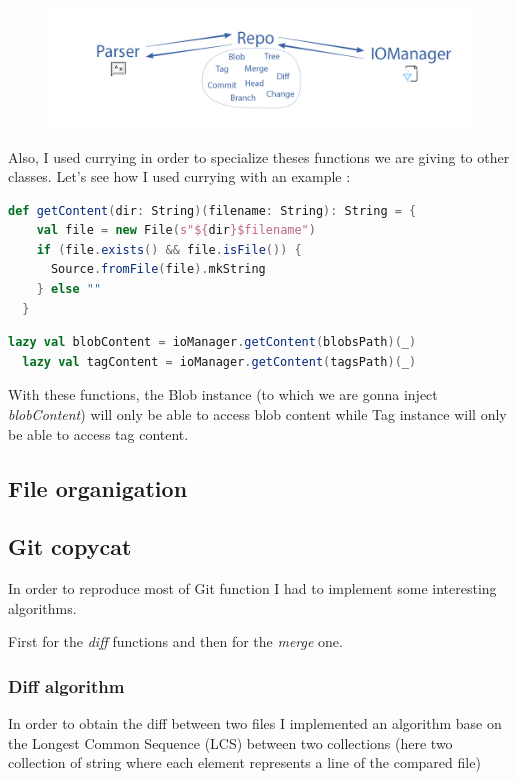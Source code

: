 \documentclass[11pt]{article}
\begin{document}
\begin{figure}[h!]
  \centering
  \includegraphics[width=\linewidth]{img/flowDetailled.png}
\end{figure}

Also, I used currying in order to specialize theses functions we are giving to other classes. Let's see how I used currying with an example :

\begin{lstlisting}[language=scala, caption=Function in IOManager]
  def getContent(dir: String)(filename: String): String = {
    val file = new File(s"${dir}$filename")
    if (file.exists() && file.isFile()) {
      Source.fromFile(file).mkString
    } else ""
  }
\end{lstlisting}

\begin{lstlisting}[language=scala, caption=Functions to be injected]
  lazy val blobContent = ioManager.getContent(blobsPath)(_)
  lazy val tagContent = ioManager.getContent(tagsPath)(_)
\end{lstlisting}

With these functions, the Blob instance (to which we are gonna inject \textit{blobContent}) will only be able to access blob content while Tag instance will only be able to access tag content.

\subsection{File organigation}


\subsection{Git copycat}

In order to reproduce most of Git function I had to implement some interesting algorithms.

First for the \textit{diff} functions and then for the \textit{merge} one.

\subsubsection{Diff algorithm}
In order to obtain the diff between two files I implemented an algorithm base on the Longest Common Sequence (LCS) between two collections (here two collection of string where each element represents a line of the compared file)
\end{document}
